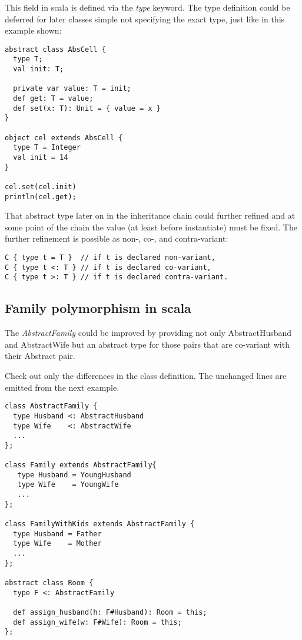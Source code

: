 \documentclass[a4paper, 10pt, conference ]{llncs}
\begin{document}
This field in scala is defined via the \emph{type} keyword. The type definition could be deferred for later classes simple not specifying the exact type, just like in this example shown:
\begin{verbatim}
abstract class AbsCell {
  type T;
  val init: T;

  private var value: T = init;
  def get: T = value;
  def set(x: T): Unit = { value = x }
}

object cel extends AbsCell {
  type T = Integer
  val init = 14
}

cel.set(cel.init)
println(cel.get);
\end{verbatim}
That abstract type later on in the inheritance chain could further refined and at some point of the chain the value (at least before instantiate) must be fixed. The further refinement is possible as non-, co-, and contra-variant:

\begin{verbatim}
C { type t = T }  // if t is declared non-variant,
C { type t <: T } // if t is declared co-variant,
C { type t >: T } // if t is declared contra-variant.
\end{verbatim}

\subsection{Family polymorphism in scala}

The \emph{AbstractFamily} could be improved by providing not only AbstractHusband and AbstractWife but an abstract type for those pairs that are co-variant with their Abstract pair. 

Check out only the differences in the class definition. The unchanged lines are emitted from the next example.

\begin{verbatim}
class AbstractFamily {
  type Husband <: AbstractHusband
  type Wife    <: AbstractWife
  ...
};

class Family extends AbstractFamily{
   type Husband = YoungHusband
   type Wife    = YoungWife
   ...
};

class FamilyWithKids extends AbstractFamily {
  type Husband = Father
  type Wife    = Mother
  ...
};

abstract class Room {
  type F <: AbstractFamily

  def assign_husband(h: F#Husband): Room = this;
  def assign_wife(w: F#Wife): Room = this;
};
\end{verbatim}
\end{document}
